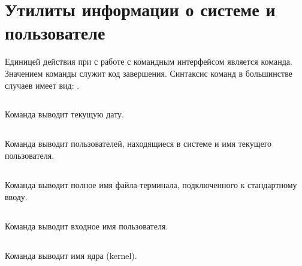 \vspace{-1em}
\section{Утилиты информации о системе и пользователе}

Единицей действия при с работе с командным интерфейсом является команда. Значением команды служит код завершения. Синтаксис команд в большинстве случаев имеет вид: .

\vspace{-1em}
\subsection{}

Команда  выводит текущую дату.


\subsection{}

Команда  выводит пользователей, находящиеся в системе и имя текущего пользователя.


\subsection{}

Команда  выводит полное имя файла-терминала, подключенного к стандартному вводу.


\subsection{}

Команда  выводит входное имя пользователя.


\subsection{}

Команда  выводит имя ядра (kernel).


\subsection{}


